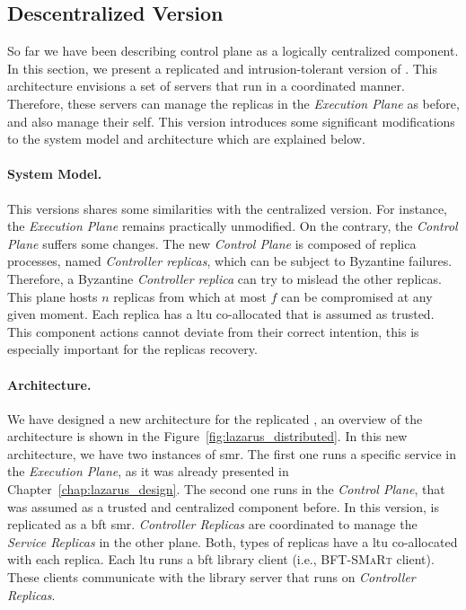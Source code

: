 \subsection{Descentralized \system Version}
So far we have been describing \system control plane as a logically centralized component. 
In this section, we present a replicated and intrusion-tolerant version of \system.
This architecture envisions a set of servers that run \system in a coordinated manner. 
Therefore, these servers can manage the replicas in the \emph{Execution Plane} as before, and also manage their self.
This version introduces some significant modifications to the system model and architecture which are explained below.

\paragraph{System Model.}
This \system versions shares some similarities with the centralized version.
For instance, the \emph{Execution Plane} remains practically unmodified.
On the contrary, the \emph{Control Plane} suffers some changes.
The new \emph{Control Plane} is composed of replica processes, named \emph{Controller replicas}, which can be subject to Byzantine failures.
Therefore, a Byzantine \emph{Controller replica} can try to mislead the other replicas.
This plane hosts $n$ replicas from which at most $f$ can be compromised at any given moment.
Each replica has a \gls{ltu} co-allocated that is assumed as trusted. 
This component actions cannot deviate from their correct intention, this is especially important for the replicas recovery.


\paragraph{Architecture.}
We have designed a new architecture for the replicated \system, an overview of the architecture is shown in the Figure~\ref{fig:lazarus_distributed}. 
In this new architecture, we have two instances of \gls{smr}.
The first one runs a specific service in the \emph{Execution Plane}, as it was already presented in Chapter~\ref{chap:lazarus_design}.
The second one runs in the \emph{Control Plane}, that was assumed as a trusted and centralized component before.
In this version, \system is replicated as a \gls{bft} \gls{smr}.
\emph{Controller Replicas} are coordinated to manage the \emph{Service Replicas} in the other plane.
Both, types of replicas have a \gls{ltu} co-allocated with each replica.
Each \gls{ltu} runs a \gls{bft} library client (i.e., \textsc{BFT-SMaRt} client). 
These clients communicate with the library server that runs on \emph{Controller Replicas}.



